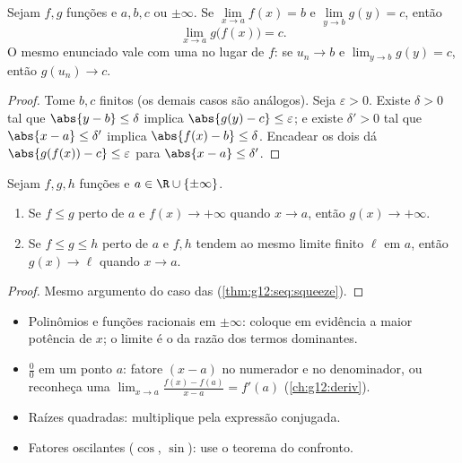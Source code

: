 \begin{theorem}\label{thm:g12:limcont:composition}
Sejam $f, g$ funções e $a, b, c$  ou $\pm\infty$. Se
$\lim\limits_{x \to a} f(x) = b$ e $\lim\limits_{y \to b} g(y) = c$,
então
\[
\lim_{x \to a} g\bigl(f(x)\bigr) = c .
\]
O mesmo enunciado vale com uma  no lugar de $f$: se
$u_n \to b$ e $\lim_{y\to b} g(y) = c$, então $g(u_n) \to c$.
\end{theorem}

\begin{proof}
Tome $b, c$ finitos (os demais casos são análogos). Seja
$\varepsilon > 0$. Existe $\delta > 0$ tal que $\abs{y - b} \leq \delta$
implica $\abs{g(y) - c} \leq \varepsilon$; e existe $\delta' > 0$ tal que
$\abs{x - a} \leq \delta'$ implica $\abs{f(x) - b} \leq \delta$. Encadear
os dois dá $\abs{g(f(x)) - c} \leq \varepsilon$ para
$\abs{x - a} \leq \delta'$.
\end{proof}

\begin{theorem}\label{thm:g12:limcont:squeeze}
Sejam $f, g, h$ funções e $a \in \R \cup \{\pm\infty\}$.
\begin{enumerate}
  \item Se $f \leq g$ perto de $a$ e $f(x) \to +\infty$ quando
        $x \to a$, então $g(x) \to +\infty$.
  \item Se $f \leq g \leq h$ perto de $a$ e $f, h$ tendem ao mesmo limite
        finito $\ell$ em $a$, então $g(x) \to \ell$ quando $x \to a$.
\end{enumerate}
\end{theorem}

\begin{proof}
Mesmo argumento do caso das  (\cref{thm:g12:seq:squeeze}).
\end{proof}

\begin{method}\label{met:g12:limcont:limits}
\begin{itemize}
  \item Polinômios e funções racionais em $\pm\infty$: coloque em
        evidência a maior potência de $x$; o limite é o da razão dos
        termos dominantes.
  \item $\frac{0}{0}$ em um ponto $a$: fatore $(x-a)$ no numerador e no
        denominador, ou reconheça uma 
        $\lim_{x\to a}\frac{f(x)-f(a)}{x-a} = f'(a)$
        (\cref{ch:g12:deriv}).
  \item Raízes quadradas: multiplique pela expressão conjugada.
  \item Fatores oscilantes ($\cos$, $\sin$): use o teorema do confronto.
\end{itemize}
\end{method}

